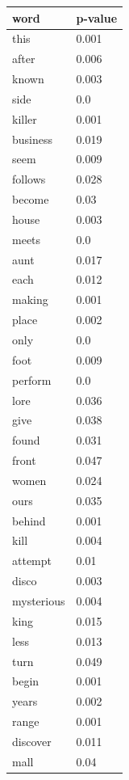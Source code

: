 \documentclass[12pt, oneside]{article}   	%
\begin{document}
\begin{table}
\begin{tabular}[t]{l|l}
\textbf{word}        & \textbf{p-value} \\ \hline
this        & 0.001    \\
after       & 0.006    \\
known       & 0.003    \\
side        & 0.0      \\
killer      & 0.001    \\
business    & 0.019    \\
seem        & 0.009    \\
follows     & 0.028    \\
become      & 0.03     \\
house       & 0.003    \\
meets       & 0.0      \\
aunt        & 0.017    \\
each        & 0.012    \\
making      & 0.001    \\
place       & 0.002    \\
only        & 0.0      \\
foot        & 0.009    \\
perform     & 0.0      \\
lore        & 0.036    \\
give        & 0.038    \\
found       & 0.031    \\
front       & 0.047    \\
women       & 0.024    \\
ours        & 0.035    \\
behind      & 0.001    \\
kill        & 0.004    \\
attempt     & 0.01     \\
disco       & 0.003    \\
mysterious  & 0.004    \\
king        & 0.015    \\
less        & 0.013    \\
turn        & 0.049    \\
begin       & 0.001    \\
years       & 0.002    \\
range       & 0.001    \\
discover    & 0.011    \\
mall        & 0.04     \\

\end{tabular}
\end{table}
\end{document}

